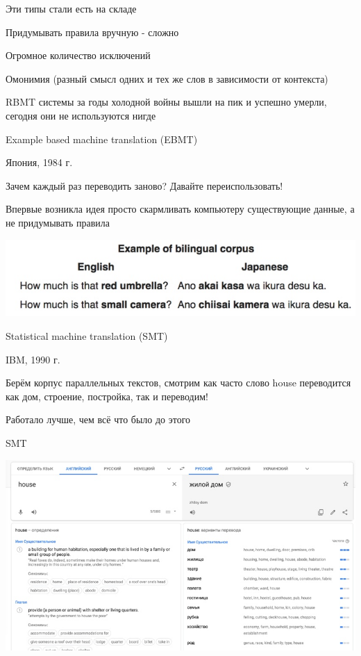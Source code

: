 \documentclass[notes,12pt, aspectratio=169]{beamer}
\newenvironment{wideitemize}{\itemize\addtolength{\itemsep}{10pt}}{\enditemize}
\begin{document}
\begin{frame} {Эти типы стали есть на складе} 
\begin{wideitemize}
	\item  Придумывать правила вручную - сложно
	\item  Огромное количество исключений 
	\item  Омонимия (разный смысл одних и тех же слов в зависимости от контекста) 
	\item  RBMT системы за годы холодной войны вышли на пик и успешно умерли, сегодня они не используются нигде 	
\end{wideitemize}
\end{frame}

\begin{frame} {Example based machine translation (EBMT)} 
\begin{wideitemize}
	\item   Япония, 1984 г. 
	\item   Зачем каждый раз переводить заново? Давайте переиспользовать! 
	\item   Впервые возникла идея просто скармливать компьютеру существующие данные, а не придумывать правила
\end{wideitemize}
\begin{center}
	\includegraphics[width=.6\linewidth]{ex_tr_1.jpg}
\end{center}
\end{frame}

\begin{frame} {Statistical machine translation (SMT)} 
\begin{wideitemize}
	\item   IBM, 1990 г. 
	\item   Берём корпус параллельных текстов, смотрим как часто слово house переводится как дом, строение, постройка, так и переводим! 
	\item   Работало лучше, чем всё что было до этого
\end{wideitemize}
\end{frame}

\begin{frame} {SMT} 
\begin{center}
	\includegraphics[width=.8\linewidth]{ggl.jpg}
\end{center}
\end{frame}
\end{document}
